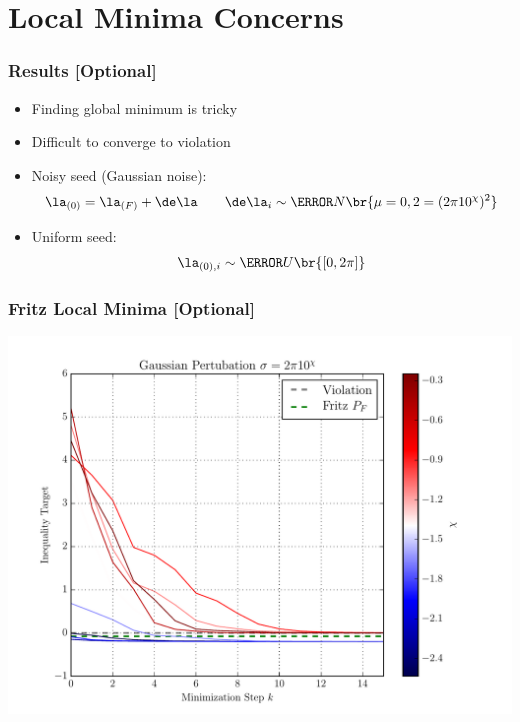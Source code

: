 \documentclass[
    hyperref={bookmarks=false},%
    xcolor={dvipsnames},
]{beamer}
\begin{document}
\section{Local Minima Concerns}

\begin{frame}
    \frametitle{Results [Optional]}
    \begin{itemize}
        \item Finding global minimum is tricky
        \item Difficult to converge to violation
        \item Noisy seed (Gaussian noise):
        \[ \la_{(0)} = \la_{(F)} + \de \la \qquad \de \la_{i} \sim \s{N}\br{\mu = 0, \si^2 = (2\pi10^{\chi})^2} \]
        \item Uniform seed:
        \[ \la_{(0), i} \sim \s{U}\br{[0, 2\pi]} \]
    \end{itemize}
\end{frame}

\begin{frame}
    \frametitle{Fritz Local Minima [Optional]}
    \includegraphics[width=\linewidth]{../../figures/optimizations/Gaussian_Perturbation_Fritz_Color_Default.pdf}
\end{frame}
\end{document}
